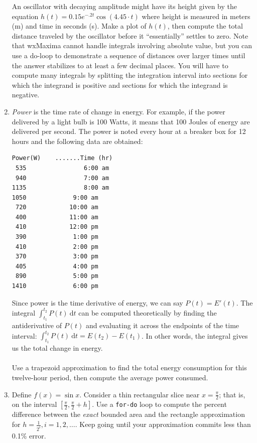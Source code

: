 \documentclass[10.5pt,twoside]{report}
\theoremstyle{definition}
\begin{document}
\begin{enumerate}
An oscillator with decaying amplitude might have its height given by the equation $h(t)=0.15e^{-.2t} \cos{(4.45\cdot t)}$ where height is measured in meters (m) and time in seconds (s).  Make a plot of $h(t)$, then compute the total distance traveled by the oscillator before it ``essentially'' settles to zero.  Note that wxMaxima cannot handle integrals involving absolute value, but you can use a do-loop to demonstrate a sequence of distances over larger times until the answer stabilizes to at least a few decimal places.  You will have to compute many integrals by splitting the integration interval into sections for which the integrand is positive and sections for which the integrand is negative.



\item \textit{Power} is the time rate of change in energy.  For example, if the power delivered by a light bulb is 100 Watts, it means that 100 Joules of energy are delivered per second.  The power is noted every hour at a breaker box for 12 hours and the following data are obtained:
\begin{verbatim}
Power(W)	.......Time (hr)
 535	            6:00 am
 940	            7:00 am
1135	            8:00 am
1050             9:00 am
 720            10:00 am
 400            11:00 am
 410            12:00 pm
 390             1:00 pm
 410             2:00 pm
 370             3:00 pm
 405             4:00 pm
 890             5:00 pm
1410             6:00 pm
\end{verbatim}
Since power is the time derivative of energy, we can say $P(t)=E'(t)$.  The integral $\displaystyle \int_{t_1}^{t_2} P(t) \ \mathrm{d}t$ can be computed theoretically by finding the antiderivative of $P(t)$ and evaluating it across the endpoints of the time interval: $\displaystyle \int_{t_1}^{t_2} P(t) \ \mathrm{d}t=E(t_2)-E(t_1)$.  In other words, the integral gives us the total change in energy.\\
${}$\\
Use a trapezoid approximation to find the total energy consumption for this twelve-hour period, then compute the average power consumed.





\item Define $f(x)=\sin{x}$.  Consider a thin rectangular slice near $x=\frac{\pi}{2}$; that is, on the interval $[\frac{\pi}{2},\frac{\pi}{2}+h]$.  Use a \verb|for-do| loop to compute the percent difference between the \textit{exact} bounded area and the rectangle approximation for $h=\frac{1}{2^i}, i=1,2,\dots $.  Keep going until your approximation commits less than 0.1\% error.

\end{enumerate}
\end{document}
